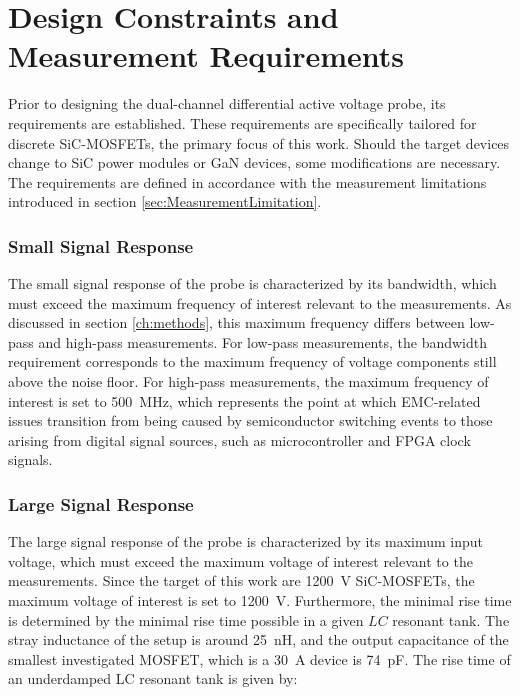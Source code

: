 
\section{Design Constraints and Measurement Requirements}
\label{sec:VoltageRequirements}

Prior to designing the dual-channel differential active voltage probe, its requirements are established. 
These requirements are specifically tailored for discrete SiC-MOSFETs, the primary focus of this work. 
Should the target devices change to SiC power modules or GaN devices, some modifications are necessary. 
The requirements are defined in accordance with the measurement limitations introduced in section \ref{sec:MeasurementLimitation}. 

\subsubsection*{Small Signal Response}
The small signal response of the probe is characterized by its bandwidth, which must exceed the maximum frequency of interest  relevant to the measurements.
As discussed in section \ref{ch:methods}, this maximum frequency differs between low-pass and high-pass measurements.
For low-pass measurements, the bandwidth requirement corresponds to the maximum frequency of voltage components still above the noise floor.
For high-pass measurements, the maximum frequency of interest is set to \SI{500}{MHz}, which represents the point at which EMC-related issues transition from being caused by semiconductor switching events to those arising from digital signal sources, such as microcontroller and FPGA clock signals.

\subsubsection*{Large Signal Response}
The large signal response of the probe is characterized by its maximum input voltage, which must exceed the maximum voltage of interest  relevant to the measurements.
Since the target of this work are \SI{1200}{V} SiC-MOSFETs, the maximum voltage of interest is set to \SI{1200}{V}.
Furthermore, the minimal rise time is determined by the minimal rise time possible in a given $LC$ resonant tank.
The stray inductance of the setup is around \SI{25}{nH}, and the output capacitance of the smallest investigated MOSFET, which is a \SI{30}{A} device is \SI{74}{pF}.
The rise time of an underdamped LC resonant tank is given by:

